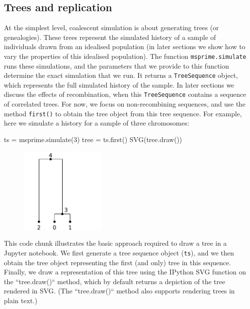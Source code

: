 \documentclass[graybox]{svmult}
\begin{document}
\subsection{Trees and replication}
At the simplest level, coalescent simulation is about generating trees (or genealogies).
These trees represent the simulated history of a sample of individuals
drawn from an idealised population (in later sections we show how to
vary the properties of this idealised population). The function
\texttt{msprime.simulate} runs these simulations, and the parameters
that we provide to this function determine the exact simulation that we
run. It returns a \texttt{TreeSequence} object, which represents the
full simulated history of the sample. In later sections we discuss the
effects of recombination, when this \texttt{TreeSequence} contains a
sequence of correlated trees. For now, we focus on non-recombining sequences, and use the method \texttt{first()} to obtain the
tree object from this tree sequence. For example, here we simulate a
history for a sample of three chromosomes:

\begin{pythoncode}
ts = msprime.simulate(3)
tree = ts.first()
SVG(tree.draw())
\end{pythoncode}

\begin{figure}
  \begin{center}
    \includegraphics[width=0.38\textwidth]{images/simulations_5_0.pdf}
  \end{center}
\end{figure}
This code chunk illustrates the basic approach required to draw a tree
in a Jupyter notebook. We first generate a tree sequence object (\texttt{ts}),
and we then obtain the tree object representing the first (and only)
tree in this sequence. Finally, we draw a representation of this tree
using the IPython SVG function on the ``tree.draw()`` method, which
by default returns a depiction of the tree rendered in SVG. (The
``tree.draw()`` method also supports rendering trees in plain text.)
\end{document}
